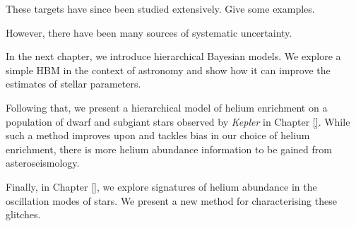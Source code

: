 These targets have since been studied extensively. Give some examples.

However, there have been many sources of systematic uncertainty. 

In the next chapter, we introduce hierarchical Bayesian models. We explore a simple HBM in the context of astronomy and show how it can improve the estimates of stellar parameters.

Following that, we present a hierarchical model of helium enrichment on a population of dwarf and subgiant stars observed by \emph{Kepler} in Chapter \ref{}. While such a method improves upon and tackles bias in our choice of helium enrichment, there is more helium abundance information to be gained from asteroseismology.

Finally, in Chapter \ref{}, we explore signatures of helium abundance in the oscillation modes of stars. We present a new method for characterising these glitches.
